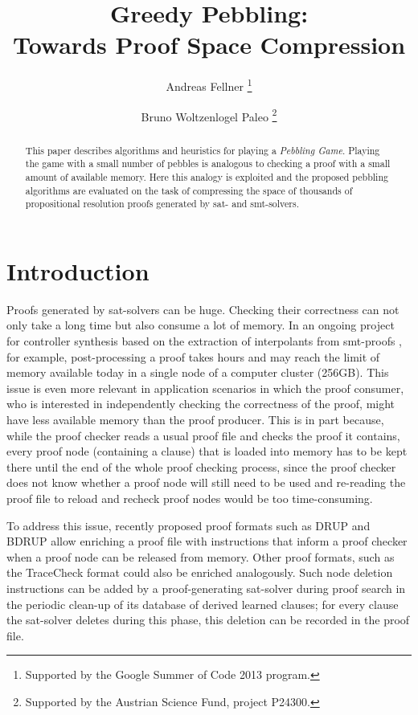 \documentclass{llncs}
\title{Greedy Pebbling: \\ 
Towards Proof Space Compression}
\author{
  Andreas Fellner 
  \thanks{Supported by the Google Summer of Code 2013 program.}
  \and 
  Bruno Woltzenlogel Paleo 
  \thanks{Supported by the Austrian Science Fund, project P24300.}
}
\institute{
  \email{fellner.a@gmail.com} \ \ \ \email{bruno@logic.at} \\
  Theory and Logic Group \\
  Institute for Computer Languages \\
  Vienna University of Technology
}
\begin{document}
\maketitle

\begin{abstract}
This paper describes algorithms and heuristics for playing a \emph{Pebbling Game}. Playing the game with a small number of pebbles is analogous to checking a proof with a small amount of available memory. Here this analogy is exploited and the proposed pebbling algorithms are evaluated on the task of compressing the space of thousands of propositional resolution proofs generated by sat- and smt-solvers.
\end{abstract}

\setcounter{footnote}{0}


\section{Introduction}

Proofs generated by sat-solvers can be huge. 
Checking their correctness can not only take a long time but also consume a lot of memory. 
In an ongoing project for controller synthesis based on the extraction of interpolants from smt-proofs \cite{Hofferek}, 
for example, post-processing a proof takes hours and may reach the limit of memory available today in a single node of a computer cluster (256GB). This issue is even more relevant in application scenarios in which the proof consumer, who is interested in independently checking the correctness of the proof, might have less available memory than the proof producer.
This is in part because, while the proof checker reads a usual proof file and checks the proof it contains, 
every proof node (containing a clause) that is loaded into memory has to be kept there until the end of the whole proof checking process, 
since the proof checker does not know whether a proof node will still need to be used and re-reading the proof file to reload and recheck proof nodes would be too time-consuming. 

To address this issue, recently proposed proof formats such as DRUP \cite{drup} and BDRUP \cite{bdrup} allow enriching a proof file with instructions that inform a proof checker when a proof node can be released from memory. Other proof formats, such as the TraceCheck format \cite{tracecheck} could also be enriched analogously. Such node deletion instructions can be added by a proof-generating sat-solver during proof search in the periodic clean-up of its database of derived learned clauses; for every clause the sat-solver deletes during this phase, this deletion can be recorded in the proof file. 
\end{document}
